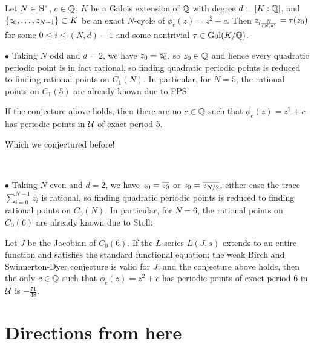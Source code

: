 \documentclass[aspectratio=1610]{beamer}
\begin{document}
\begin{frame}
  \begin{hconjecture}
    \label{cj:galois-conjugate}
    Let $N \in \mathbb{N}^*$, $c \in \mathbb{Q}$, $K$ be a Galois extension of $\mathbb{Q}$
    with degree $d = [K : \mathbb{Q}]$, and $\left\{z_0, \dots, z_{N-1}\right\} \subset
    K$ be an exact $N$-cycle of $\phi_c(z) = z^2 + c$. Then $z_{i\frac{N}{(N, d)}}
    = \tau(z_0)$ for some $0 \le i \le (N, d)-1$ and some nontrivial $\tau
    \in \mathrm{Gal}(K/\mathbb{Q})$.
  \end{hconjecture}

  \pause

  $\bullet$ Taking $N$ odd and $d = 2$, we have $z_0 = \overline{z_0}$, so
  $z_0 \in \mathbb{Q}$ and hence every quadratic periodic point is in fact
  rational, so finding quadratic periodic points is reduced to finding
  rational points on $C_1(N)$. In particular, for $N = 5$, the
  rational points on $C_1(5)$ are already known due to FPS:

  \begin{hcorollary}
    If the conjecture above holds, then there are no $c \in \mathbb{Q}$ such
    that $\phi_c(z) = z^2 + c$ has periodic points in $\mathcal{U}$ of exact
    period 5.
  \end{hcorollary}

  Which we conjectured before!

  \pause\

  $\bullet$ Taking $N$ even and $d = 2$, we have $z_0 = \overline{z_0}$ or
  $z_0 = \overline{z_{N/2}}$, either case the trace $\sum_{i=0}^{N-1}z_i$
  is rational, so finding quadratic periodic points is reduced to
  finding rational points on $C_0(N)$. In particular, for $N = 6$, the
  rational points on $C_0(6)$ are already known due to Stoll:

  \begin{hcorollary}
    \label{cor:6-cycle}
    Let $J$ be the Jacobian of $C_0(6)$. If the $L$-series $L(J, s)$
    extends to an entire function and satisfies the standard
    functional equation; the weak Birch and Swinnerton-Dyer conjecture
    is valid for $J$; and the conjecture above holds, then the only $c
    \in \mathbb{Q}$ such that $\phi_c(z) = z^2 + c$ has periodic points of
    exact period 6 in $\mathcal{U}$ is $-\frac{71}{48}$.
  \end{hcorollary}
\end{frame}

\section{Directions from here}
\end{document}
